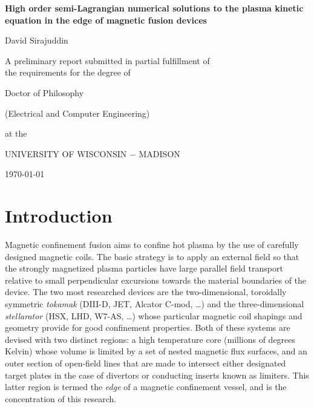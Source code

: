\documentclass[11pt,titlepage]{report}
\begin{document}
\begin{titlepage}
\begin{center}

\vspace*{1 in}

\textbf{High order semi-Lagrangian numerical solutions to the plasma kinetic equation in the edge of magnetic fusion devices}

\vspace{1 in}

David Sirajuddin

\vspace{0.5 in}

A preliminary report submitted in partial fulfillment of\\
the requirements for the degree of

\vspace{0.5 in}

Doctor of Philosophy

\vspace{0.25 in}

(Electrical and Computer Engineering)

\vspace{0.5 in}

at the

\vspace{0.5 in}

UNIVERSITY OF WISCONSIN $-$ MADISON

\vspace{0.5 in}

\today

\end{center}
\end{titlepage}

\setcounter{page}{1}
\setlength{\parindent}{1cm}
\tableofcontents
\pagebreak
\listoffigures
\listoftables
\pagebreak


\chapter{Introduction}\label{chap:Introduction}


\indent \indent Magnetic confinement fusion aims to confine hot plasma by the use of carefully designed magnetic coils. The basic strategy is to apply an external field so that the strongly magnetized plasma particles have large parallel field transport relative to small perpendicular excursions towards the material boundaries of the device. The two most researched devices are the two-dimensional, toroidally symmetric \emph{tokamak} (DIII-D, JET, Alcator C-mod, \ldots ) and the three-dimensional \emph{stellarator} (HSX, LHD, W7-AS, \ldots ) whose particular magnetic coil shapings and geometry provide for good confinement properties. Both of these systems are devised with two distinct regions: a high temperature core (millions of degrees Kelvin) whose volume is limited by a set of nested magnetic flux surfaces, and an outer section of open-field lines that are made to intersect either designated target plates in the case of divertors or conducting inserts known as limiters. This latter region is termed the \emph{edge} of a magnetic confinement vessel, and is the concentration of this research.
\end{document}
